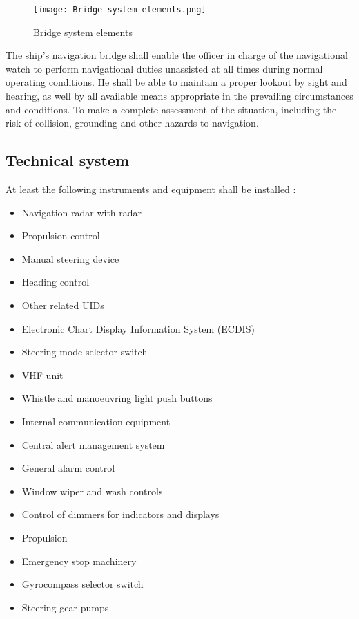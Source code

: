 \begin{figure}[H]
	\centering
	\texttt{[image: Bridge-system-elements.png]}
	\caption{Bridge system elements}
	\label{fig:Bridge-system-elements}
\end{figure}

The ship’s navigation bridge shall enable the officer in charge of the navigational watch to perform navigational duties unassisted at all times during normal operating conditions. He shall be able to maintain a proper lookout by sight and hearing, as well by all available means appropriate in the prevailing circumstances and conditions. To make a complete assessment of the situation, including the risk of collision, grounding and other hazards to navigation.

\subsection{Technical system}
At least the following instruments and equipment shall be installed \cite{DNVGL2011}: 
\begin{multicols}{2}
	\begin{itemize}
		\item Navigation radar with radar
		\item Propulsion control
		\item Manual steering device
		\item Heading control
		\item Other related \ac{UID}s
		\item Electronic Chart Display Information System (ECDIS)
		\item Steering mode selector switch
		\item VHF unit
		\item Whistle and manoeuvring light push buttons
		\item Internal communication equipment
		\item Central alert management system
		\item General alarm control
		\item Window wiper and wash controls
		\item Control of dimmers for indicators and displays
		\item Propulsion
		\item Emergency stop machinery
		\item Gyrocompass selector switch
		\item Steering gear pumps
	\end{itemize}
\end{multicols}

